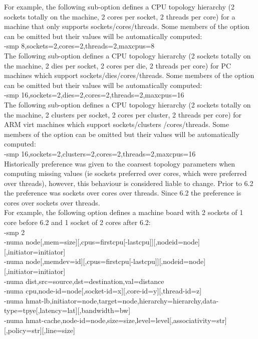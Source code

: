 \documentclass[11pt, a4paper, oneside]{article}
\theoremstyle{definition}
\begin{document}
    For example, the following sub-option defines a CPU topology hierarchy (2 sockets totally on the machine, 2 cores per socket, 2 threads per core) for a machine that only supports sockets/cores/threads. Some members of the option can be omitted but their values will be automatically computed:\\

    -smp 8,sockets=2,cores=2,threads=2,maxcpus=8\\

    The following sub-option defines a CPU topology hierarchy (2 sockets totally on the machine, 2 dies per socket, 2 cores per die, 2 threads per core) for PC machines which support sockets/dies/cores/threads. Some members of the option can be omitted but their values will be automatically computed:\\

    -smp 16,sockets=2,dies=2,cores=2,threads=2,maxcpus=16\\

    The following sub-option defines a CPU topology hierarchy (2 sockets totally on the machine, 2 clusters per socket, 2 cores per cluster, 2 threads per core) for ARM virt machines which support sockets/clusters /cores/threads. Some members of the option can be omitted but their values will be automatically computed:\\

    -smp 16,sockets=2,clusters=2,cores=2,threads=2,maxcpus=16\\

    Historically preference was given to the coarsest topology parameters when computing missing values (ie sockets preferred over cores, which were preferred over threads), however, this behaviour is considered liable to change. Prior to 6.2 the preference was sockets over cores over threads. Since 6.2 the preference is cores over sockets over threads.\\

    For example, the following option defines a machine board with 2 sockets of 1 core before 6.2 and 1 socket of 2 cores after 6.2:\\

    -smp 2\\

-numa node[,mem=size][,cpus=firstcpu[-lastcpu]][,nodeid=node][,initiator=initiator]\\
-numa node[,memdev=id][,cpus=firstcpu[-lastcpu]][,nodeid=node][,initiator=initiator]\\
-numa dist,src=source,dst=destination,val=distance\\
-numa cpu,node-id=node[,socket-id=x][,core-id=y][,thread-id=z]\\
-numa hmat-lb,initiator=node,target=node,hierarchy=hierarchy,data-type=tpye[,latency=lat][,bandwidth=bw]\\
-numa hmat-cache,node-id=node,size=size,level=level[,associativity=str][,policy=str][,line=size]\\
\end{document}
